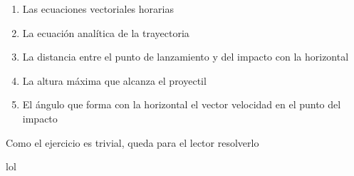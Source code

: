 \begin{enumerate}[label=\Alph*)]
  \item Las ecuaciones vectoriales horarias
  \item La ecuación analítica de la trayectoria
  \item La distancia entre el punto de
  lanzamiento y del impacto con la horizontal
  \item La altura máxima que alcanza el proyectil
  \item El ángulo que forma con la horizontal el vector
  velocidad en el punto del impacto
\end{enumerate}

Como el ejercicio es trivial, queda para el lector
resolverlo

lol